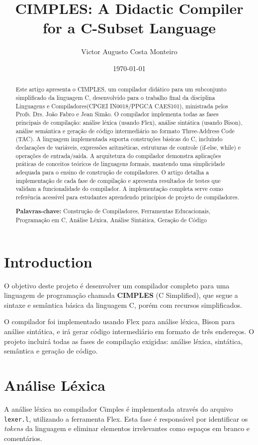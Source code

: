 \documentclass[10pt,twocolumn]{article}
\title{\textbf{CIMPLES: A Didactic Compiler for a C-Subset Language}}
\author{
    Victor Augusto Costa Monteiro
}
\date{\today}
\begin{document}
\maketitle

\begin{abstract}
    Este artigo apresenta o CIMPLES, um compilador didático para um subconjunto 
    simplificado da linguagem C, desenvolvido para o trabalho final da disciplina
    Linguagens e Compiladores(CPGEI IN0018/PPGCA CAES101), ministrada pelos Profs. Drs.
    João Fabro e Jean Simão. O compilador 
    implementa todas as fases principais de compilação: análise léxica (usando Flex), 
    análise sintática (usando Bison), análise semântica e geração de código 
    intermediário no formato Three-Address Code (TAC). A linguagem implementada 
    suporta construções básicas do C, incluindo declarações de variáveis, expressões 
    aritméticas, estruturas de controle (if-else, while) e operações de entrada/saída. 
    A arquitetura do compilador demonstra aplicações práticas de conceitos teóricos 
    de linguagens formais, mantendo uma simplicidade adequada para o ensino de 
    construção de compiladores. O artigo detalha a implementação de cada fase de 
    compilação e apresenta resultados de testes que validam a funcionalidade do 
    compilador. A implementação completa serve como referência acessível para 
    estudantes aprendendo princípios de projeto de compiladores.

    \textbf{Palavras-chave:} Construção de Compiladores, Ferramentas Educacionais, Programação em C, Análise Léxica, Análise Sintática, Geração de Código
\end{abstract}

\section{Introduction}
    O objetivo deste projeto é desenvolver um compilador completo para uma linguagem 
    de programação chamada \textbf{CIMPLES} (C Simplified), que segue a sintaxe e 
    semântica básica da linguagem C, porém com recursos simplificados.

    O compilador foi implementado usando Flex para análise léxica, Bison para 
    análise sintática, e irá gerar código intermediário em formato de 
    três endereços. O projeto incluirá todas as fases de compilação exigidas: 
    análise léxica, sintática, semântica e geração de código.

\section{Análise Léxica}
    A análise léxica no compilador Cimples é implementada através do arquivo 
    \texttt{lexer.l}, utilizando a ferramenta Flex. Esta fase é responsável por 
    identificar os \textit{tokens} da linguagem e eliminar elementos irrelevantes 
    como espaços em branco e comentários.
\end{document}
